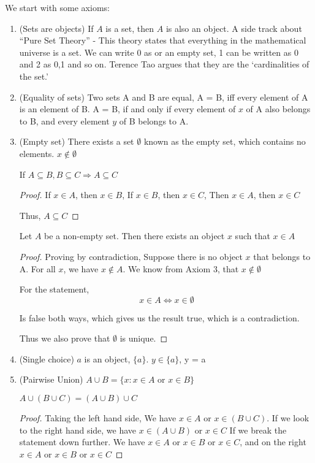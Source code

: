 \documentclass[11pt]{report}
\begin{document}
We start with some axioms:
\begin{enumerate}
	\item (Sets are objects) If $A$ is a set, then $A$ is also an object.
	      A side track about ``Pure Set Theory'' - This theory states that everything in the mathematical universe is a set. We can write 0 as {} or an empty set, 1 can be written as {0} and 2 as {0,1} and so on. Terence Tao argues that they are the `cardinalities of the set.'
	\item (Equality of sets) Two sets A and B are equal, A = B, iff every element of A is an element of B. A = B, if and only if every element of $x$ of A also belongs to B, and every element $y$ of B belongs to A.
	\item (Empty set) There exists a set $\emptyset$ known as the empty set, which contains no elements. $x \notin \emptyset$
	      \begin{prop}
		      If $A \subseteq B, B \subseteq C \Rightarrow A \subseteq C$
	      \end{prop}
	      \begin{proof}
		      If $x \in A$, then $x \in B$,
		      If $x \in B$, then $x \in C$,
		      Then $x \in A$, then $x \in C$

		      Thus, $A \subseteq C$
	      \end{proof}
	      \begin{lemma}
		      Let $A$ be a non-empty set. Then there exists an object $x$ such that $x \in A$
	      \end{lemma}
	      \begin{proof}
		      Proving by contradiction,
		      Suppose there is no object $x$ that belongs to A. For all $x$, we have $x \notin A$. We know from Axiom 3, that $x \notin \emptyset$

		      For the statement,
		      $$ x \in A \Leftrightarrow x \in \emptyset $$

		      Is false both ways, which gives us the result true, which is a contradiction.

		      Thus we also prove that $\emptyset$ is unique.
	      \end{proof}
	\item (Single choice) $a$ is an object, $\{a\}$. $y \in \{a\}$, y = a
	\item (Pairwise Union) $A \cup B = \{x : x \in A \text{ or } x \in B\}$
	      \begin{lemma}
		      $A \cup (B \cup C) = (A \cup B) \cup C$
	      \end{lemma}
	      \begin{proof}
		      Taking the left hand side,
		      We have $x \in A$ or $x \in (B \cup C)$. If we look to the right hand side, we have $x \in (A \cup B)$ or $ x \in C$
		      If we break the statement down further.
		      We have $x \in A$ or $x \in B$ or $x \in C$, and  on the right $x \in A$ or $x \in B$ or $x\in C$


\end{proof}
\end{enumerate}
\end{document}
